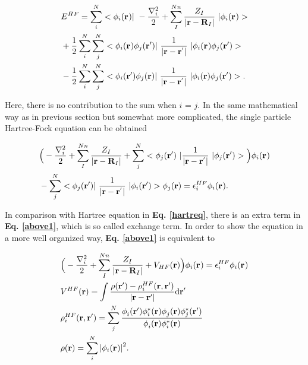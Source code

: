 \documentclass[a4paper, 12pt, titlepage,oneside,drop]{kthesis}
\begin{document}
\begin{equation}\begin{split}
&E^{HF} = \sum\limits_i^{{N}} <\bwff<i><> |\ -\frac{\nabla^{2}_{i}}{2} + \sum\limits_I^{{Nn}} \frac{Z_{I}}{|\textbf{r}-\textbf{R}_{I}|}  \ | \bwff<i><> > \\
& + \frac{1}{2} \sum\limits_i^{{N}} \sum\limits_j^{{N}} <\bwff<i><> \bwfn<j><'>|\ \frac{1}{|\textbf{r} - \textbf{r}^{'} |} \ | \bwff<i><> \bwfn<j><'>> \\
& - \frac{1}{2} \sum\limits_i^{{N}} \sum\limits_j^{{N}} <\bwfn<i><'> \bwfn<j><>|\ \frac{1}{|\textbf{r} - \textbf{r}^{'} |} \ | \bwfn<i><> \bwfn<j><'>>.
\end{split}\end{equation}

Here, there is no contribution to the sum when $i$ = $j$. In the same mathematical way as in previous section but somewhat more complicated, the single particle Hartree-Fock equation can be obtained

\begin{equation}\begin{split}\label{above1}
& \Big( -\frac{\nabla^{2}_{i}}{2} + \sum\limits_I^{{Nn}} \frac{Z_{I}}{|\textbf{r}-\textbf{R}_{I}|} + \sum\limits_{j}^{{N}} <\bwfn<j><'>\ | \frac{1}{|\textbf{r} - \textbf{r}^{'} |} \ | \bwfn<j><'>> \Big) \bwff<i><>  \\
& - \sum\limits_{j}^{{N}}  < \bwfn<j><'>|\ \frac{1}{|\textbf{r} - \textbf{r}^{'} |} \ | \bwfn<i><'> > \bwfn<j><>  = \epsilon_{i}^{{HF}} \bwff<i><>.
\end{split}\end{equation}

In comparison with Hartree equation in \textbf{Eq. \ref{hartreq}}, there is an extra term in \textbf{Eq. \ref{above1}}, which is so called exchange term. In order to show the equation in a more well organized way,
\textbf{Eq. \ref{above1}} is equivalent to

\begin{equation}\label{aaaaa}\begin{split}
& \Big( -\frac{\nabla^{2}_{i}}{2} +  \sum\limits_I^{{Nn}} \frac{Z_{I}}{|\textbf{r}-\textbf{R}_{I}|} +V_{HF}(\textbf{r}) \Big)  \bwff<i><>  = \epsilon_{i}^{{HF}}   \bwff<i><> \\
&  V^{HF}(\textbf{r})= \int \frac{\rho(\textbf{r}{'}) - \rho_{{i}}^{{HF}}(\textbf{r},\textbf{r}{'})}{|\textbf{r} - \textbf{r}{'} |}  \mathrm{d}\textbf{r}{'} \\
& \rho_{{i}}^{{HF}}(\textbf{r},\textbf{r}{'}) = \sum\limits_j^N \frac{\phi_{i}^{}(\textbf{r}{'}) \phi_{i}^{*}(\textbf{r}{}) \phi_{j}^{}(\textbf{r}{}) \phi_{j}^{*}(\textbf{r}{'})} {\phi_{i}^{}(\textbf{r}) \phi_{i}^{*}(\textbf{r})}  \\
& \rho(\textbf{r}) = \sum\limits_i^N  {|\bwff<i><>|}^{2}.
\end{split}
\end{equation}
\end{document}
